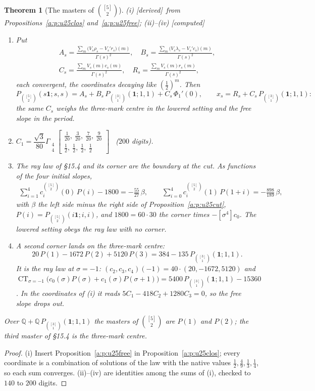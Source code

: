 \documentclass[11pt]{article}
\newcommand{\one}{\mathbf 1}
\newcommand{\Gst}[4]{\Gamma_{\substack{#1\\#2}}\!\begin{bmatrix}#3\\#4\end{bmatrix}}
\DeclareMathOperator*{\CT}{CT}
\newcommand{\Pth}{P_{\binom{[3]}1}(\one;1,1)}
\theoremstyle{plain}
\newtheorem{theorem}[proposition]{Theorem}
\theoremstyle{definition}
\theoremstyle{remark}
\newcommand{\derived}{\textup{[derived]}}
\newcommand{\computed}{\textup{[computed]}}
\begin{document}
\begin{theorem}[The masters of $\binom{[5]}2$]\label{a:t:u25masters}(i) \derived\ from Propositions~\ref{a:p:u25clos} and~\ref{a:p:u25free}; (ii)--(iv) \computed\
\begin{enumerate}[label=(\roman*)]
\item Put
\begin{gather*}
A_s=\frac{\sum_m\big(V_s\rho_s-V_s'r_s\big)(m)}{\Gamma(s)^2},\quad B_s=\frac{\sum_m\big(V_s\lambda_s-V_s'c_s\big)(m)}{\Gamma(s)^2},\\
C_s=\frac{\sum_mV_s(m)c_s(m)}{\Gamma(s)^2},\quad R_s=\frac{\sum_mV_s(m)r_s(m)}{\Gamma(s)^2},
\end{gather*}
each convergent, the coordinates decaying like $(\frac12)^m$. Then
\[
P_{\binom{[5]}2}(s\one;s,s)=A_s+B_s\,\Pth+C_s\,\Phi_1'(0),\qquad x_s=R_s+C_s\,\Pth :
\]
the same $C_s$ weighs the three-mark centre in the lowered setting and the free slope in the period.
\item $C_1=\dfrac{\sqrt3}{80}\Gst44{\tfrac1{20},\ \tfrac3{20},\ \tfrac7{20},\ \tfrac9{20}}{\tfrac12,\ \tfrac12,\ \tfrac12,\ \tfrac12}$ \ ($200$ digits).
\item The ray law of \S15.4 and its corner are the boundary at the cut. As functions of the four initial slopes,
\begin{gather*}
\sum_{i=1}^4c^{\binom{[5]}2}_i(0)\,P(i)-1800=-\tfrac{55}{27}\,\beta,\qquad\sum_{i=0}^4c^{\binom{[5]}2}_i(1)\,P(1+i)=-\tfrac{898}{189}\,\beta,
\end{gather*}
with $\beta$ the left side minus the right side of Proposition~\ref{a:p:u25cut}, $P(i)=P_{\binom{[5]}2}(i\one;i,i)$, and $1800=60\cdot30$ the corner times $-[\sigma^4]c_0$. The lowered setting obeys the ray law with no corner.
\item A second corner lands on the three-mark centre:
\[
20\,P(1)-1672\,P(2)+5120\,P(3)=384-135\,\Pth .
\]
It is the ray law at $\sigma=-1$: $(c_2,c_3,c_4)(-1)=40\cdot(20,-1672,5120)$ and $\CT_{\sigma=-1}\big(c_0(\sigma)P(\sigma)+c_1(\sigma)P(\sigma+1)\big)=5400\,\Pth-15360$. In the coordinates of (i) it reads $5C_1-418C_2+1280C_3=0$, so the free slope drops out.
\end{enumerate}
Over $\mathbb Q+\mathbb Q\,\Pth$ the masters of $\binom{[5]}2$ are $P(1)$ and $P(2)$; the third master of \S15.4 is the three-mark centre.
\end{theorem}

\begin{proof}
(i) Insert Proposition~\ref{a:p:u25free} in Proposition~\ref{a:p:u25clos}; every coordinate is a combination of solutions of the law with the native values $\frac12,\frac49,\frac13,\frac14$, so each sum converges. (ii)--(iv) are identities among the sums of (i), checked to $140$ to $200$ digits.
\end{proof}
\end{document}
